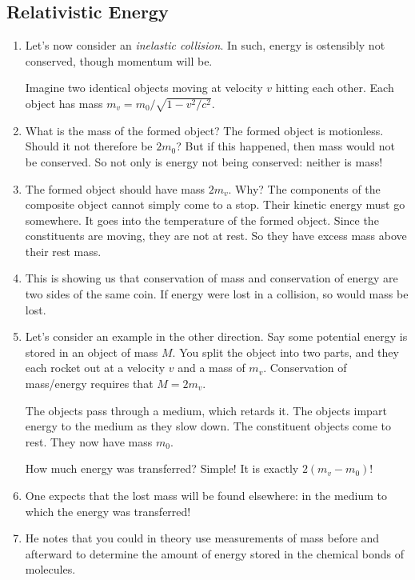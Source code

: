 \subsection{Relativistic Energy}

\begin{enumerate}

  \item Let's now consider an \emph{inelastic collision}. In such,
  energy is ostensibly not conserved, though momentum will be.

  Imagine two identical objects moving at velocity $v$ hitting each
  other. Each object has mass $m_v = m_0/\sqrt{1 - v^2/c^2}$.

  \item What is the mass of the formed object? The formed object is
  motionless. Should it not therefore be $2m_0$? But if this happened,
  then mass would not be conserved. So not only is energy not being
  conserved: neither is mass!

  \item The formed object should have mass $2m_v$. Why? The components
  of the composite object cannot simply come to a stop. Their kinetic
  energy must go somewhere. It goes into the temperature of the formed
  object. Since the constituents are moving, they are not at rest. So
  they have excess mass above their rest mass.

  \item This is showing us that conservation of mass and conservation of
  energy are two sides of the same coin. If energy were lost in a
  collision, so would mass be lost.

  \item Let's consider an example in the other direction. Say some
  potential energy is stored in an object of mass $M$. You split the
  object into two parts, and they each rocket out at a velocity $v$ and
  a mass of $m_v$. Conservation of mass/energy requires that $M = 2m_v$.

  The objects pass through a medium, which retards it. The objects
  impart energy to the medium as they slow down. The constituent objects
  come to rest. They now have mass $m_0$.

  How much energy was transferred? Simple! It is exactly $2(m_v - m_0)$!

  \item One expects that the lost mass will be found elsewhere: in the
  medium to which the energy was transferred!

  \item He notes that you could in theory use measurements of mass
  before and afterward to determine the amount of energy stored in the
  chemical bonds of molecules.

\end{enumerate}
